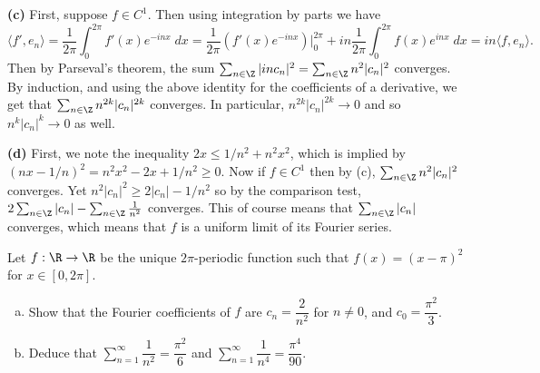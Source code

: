 \documentclass[11pt,letterpaper]{article}
\begin{document}
\begin{solution}
    \textbf{(c)} First, suppose $f\in C^1$. Then using integration by parts we have
    \[
        \big\langle f',e_n \big\rangle = \frac{1}{2\pi}\int^{2\pi}_0 f'(x)e^{-inx}\;dx=\frac{1}{2\pi}\left( f'(x)e^{-inx}\right)\bigg|_0^{2\pi}+in\frac{1}{2\pi}\int^{2\pi}_0 f(x)e^{inx}\;dx=in\big\langle f,e_n \big\rangle
    .\]  
    Then by Parseval's theorem, the sum $\sum_{n\in \Z}|in c_n|^2 = \sum_{n\in \Z}n^2|c_n|^2$ converges. By induction, and using the above identity for the coefficients of a derivative, we get that $\sum_{n\in \Z}n^{2k}|c_n|^{2k}$ converges. In particular, $n^{2k}|c_n|^{2k}\to 0$ and so $n^k|c_n|^k\to 0$ as well.
    
    \textbf{(d)} First, we note the inequality $2x\leq 1/n^2+n^2x^2$, which is implied by $(nx-1 /n)^2=n^2x^2-2x+1 /n^2\geq 0$. Now if $f\in C^1$ then by (c), $\sum_{n\in \Z} n^2|c_n|^2$ converges. Yet $n^2|c_n|^2\geq 2|c_n|- 1/n^2$ so by the comparison test, $2\sum_{n\in \Z}|c_n|-\sum_{n\in \Z}\frac{1}{n^2}$ converges. This of course means that $\sum_{n\in \Z}|c_n|$ converges, which means that $f$ is a uniform limit of its Fourier series.  
\end{solution}

\begin{problem}
    Let $f:\R\to \R$ be the unique $2\pi$-periodic function such that $f(x)=(x-\pi)^2$ for $x\in [0,2\pi]$.
    \begin{enumerate}[(a)]
        \item Show that the Fourier coefficients of $f$ are $c_n=\dfrac{2}{n^2}$ for $n\neq 0$, and $c_0=\dfrac{\pi^2}{3}$.
        \item Deduce that $\sum\limits_{n=1}^\infty \dfrac{1}{n^2}=\dfrac{\pi^2}{6}$ and $\sum\limits_{n=1}^\infty \dfrac{1}{n^4}=\dfrac{\pi^4}{90}$.
    \end{enumerate}
\end{problem}
\end{document}
